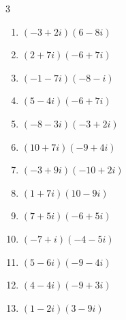 \begin{multicols}{3}
\begin{enumerate}
  \item $\displaystyle (-3+2i)(6-8i)$

        \phantom{$\displaystyle =-2+36i$}

  \item $\displaystyle (2+7i)(-6+7i)$

        \phantom{$\displaystyle =-61-28i$}

  \item $\displaystyle (-1-7i)(-8-i)$

        \phantom{$\displaystyle =1+57i$}

  \item $\displaystyle (5-4i)(-6+7i)$

        \phantom{$\displaystyle =-2+59i$}

  \item $\displaystyle (-8-3i)(-3+2i)$

        \phantom{$\displaystyle =30-7i$}

  \item $\displaystyle (10+7i)(-9+4i)$

        \phantom{$\displaystyle =-118-23i$}

  \item $\displaystyle (-3+9i)(-10+2i)$

        \phantom{$\displaystyle =12-96i$}

  \item $\displaystyle (1+7i)(10-9i)$

        \phantom{$\displaystyle =73+61i$}

  \item $\displaystyle (7+5i)(-6+5i)$

        \phantom{$\displaystyle =-67+5i$}

  \item $\displaystyle (-7+i)(-4-5i)$

        \phantom{$\displaystyle =33+31i$}

  \item $\displaystyle (5-6i)(-9-4i)$

        \phantom{$\displaystyle =-69+34i$}

  \item $\displaystyle (4-4i)(-9+3i)$

        \phantom{$\displaystyle =-24+48i$}

  \item $\displaystyle (1-2i)(3-9i)$

        \phantom{$\displaystyle =-15-15i$}


\end{enumerate}
\end{multicols}
